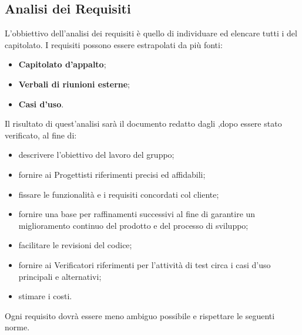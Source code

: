 \documentclass[NormeDiProgetto.tex]{subfiles}
\begin{document}
\subsection{Analisi dei Requisiti}
L'obbiettivo dell'analisi dei requisiti è quello di individuare ed elencare tutti i  del capitolato. I requisiti possono essere estrapolati da più fonti:
\begin{itemize}
	\item \textbf{Capitolato d’appalto};
	\item \textbf{Verbali di riunioni esterne};
	\item \textbf{Casi d’uso}.
\end{itemize}
Il risultato di quest'analisi sarà il documento \adr \vruno{} redatto dagli \anali,dopo essere stato verificato, al fine di:
\begin{itemize}
\item descrivere l'obiettivo del lavoro del gruppo;
\item fornire ai Progettisti riferimenti precisi ed affidabili;
\item fissare le funzionalità e i requisiti concordati col cliente;
\item fornire una base per raffinamenti successivi al fine di garantire un
miglioramento continuo del prodotto e del processo di sviluppo;
\item facilitare le revisioni del codice;
\item fornire ai Verificatori riferimenti per l’attività di test circa i casi d’uso principali e alternativi;
\item stimare i costi.
\end{itemize}
Ogni requisito dovrà essere meno ambiguo possibile e rispettare le seguenti norme.
\end{document}
